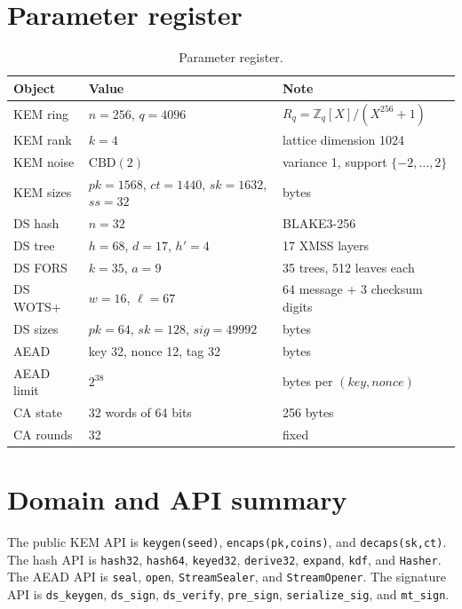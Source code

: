 \documentclass[runningheads]{llncs}
\newcommand{\Z}{\mathbb{Z}}
\newcommand{\CBD}{\mathrm{CBD}}
\begin{document}
\appendix

\section{Parameter register}
\label{app:params}

\begin{longtable}{@{}p{3.2cm}p{4.7cm}p{4.1cm}@{}}
\caption{Parameter register.}\\
\toprule
Object & Value & Note \\
\midrule
\endhead
KEM ring & $n=256$, $q=4096$ & $R_q=\Z_q[X]/(X^{256}+1)$ \\
KEM rank & $k=4$ & lattice dimension 1024 \\
KEM noise & $\CBD(2)$ & variance 1, support $\{-2,\ldots,2\}$ \\
KEM sizes & $pk=1568$, $ct=1440$, $sk=1632$, $ss=32$ & bytes \\
DS hash & $n=32$ & BLAKE3-256 \\
DS tree & $h=68$, $d=17$, $h'=4$ & 17 XMSS layers \\
DS FORS & $k=35$, $a=9$ & 35 trees, 512 leaves each \\
DS WOTS+ & $w=16$, $\ell=67$ & 64 message + 3 checksum digits \\
DS sizes & $pk=64$, $sk=128$, $sig=49992$ & bytes \\
AEAD & key 32, nonce 12, tag 32 & bytes \\
AEAD limit & $2^{38}$ & bytes per $(key,nonce)$ \\
CA state & 32 words of 64 bits & 256 bytes \\
CA rounds & 32 & fixed \\
\bottomrule
\end{longtable}

\section{Domain and API summary}
\label{app:api}

The public KEM API is
\texttt{keygen(seed)}, \texttt{encaps(pk,coins)}, and
\texttt{decaps(sk,ct)}.  The hash API is
\texttt{hash32}, \texttt{hash64}, \texttt{keyed32}, \texttt{derive32},
\texttt{expand}, \texttt{kdf}, and \texttt{Hasher}.  The AEAD API is
\texttt{seal}, \texttt{open}, \texttt{StreamSealer}, and
\texttt{StreamOpener}.  The signature API is
\texttt{ds\_keygen}, \texttt{ds\_sign}, \texttt{ds\_verify},
\texttt{pre\_sign}, \texttt{serialize\_sig}, and \texttt{mt\_sign}.
\end{document}
